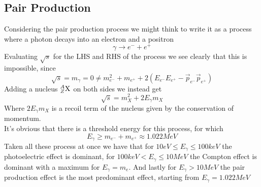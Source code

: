 \documentclass[../qm.tex]{subfiles}
\begin{document}
\subsection{Pair Production}
Considering the pair production process we might think to write it as a process where a photon decays into an electron and a positron
\begin{equation*}
	\gamma\to e^-+e^+
\end{equation*}
Evaluating $\sqrt{s}$ for the LHS and RHS of the process we see clearly that this is impossible, since
\begin{equation*}
	\sqrt{s}=m_\gamma=0\ne m_{e^-}^2+m_{e^+}+2\left( E_{e^-}E_{e^+}-\vec{p}_{e^-}\vec{p}_{e^+} \right)
\end{equation*}
Adding a nucleus $\nuc{X}{A}{Z}$ on both sides we instead get
\begin{equation*}
	\sqrt{s}=m_X^2+2E_\gamma m_X
\end{equation*}
Where $2E_\gamma m_X$ is a recoil term of the nucleus given by the conservation of momentum.\\
It's obvious that there is a threshold energy for this process, for which
\begin{equation}
	E_\gamma\ge m_{e^-}+m_{e^+}\approx1.022\unit{MeV}
	\label{eq:thresholdpairprod}
\end{equation}
Taken all these process at once we have that for $10\unit{eV}\le E_\gamma\le100\unit{keV}$ the photoelectric effect is dominant, for $100\unit{keV}<E_\gamma\le10\unit{MeV}$ the Compton effect is dominant with a maximum for $E_\gamma=m_e$. And lastly for $E_\gamma>10\unit{MeV}$ the pair production effect is the most predominant effect, starting from $E_\gamma=1.022\unit{MeV}$
\end{document}
